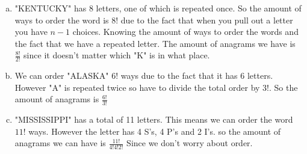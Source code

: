 \documentclass[11pt,letterpaper]{article}
\begin{document}
\begin{enumerate}[(a)]
\item
"KENTUCKY" has 8 letters, one of which is repeated once. So the amount of ways to order the word is $8!$ due to the fact that when you pull out a letter you have $n-1$ choices. Knowing the amount of ways to order the words and the fact that we have a repeated letter. The amount of anagrams we have is $\frac{8!}{2!}$ since it doesn't matter which "K" is in what place.\\
\item
We can order "ALASKA" $6!$ ways due to the fact that it has 6 letters. However "A" is repeated twice so have to divide the total order by $3!$. So the amount of anagrams is $\frac{6!}{3!}$\\
\item
"MISSISSIPPI" has a total of 11 letters. This means we can order the word $11!$ ways. However the letter has 4 S's, 4 P's and 2 I's. so the amount of anagrams we can have is $\frac{11!}{4!4!2!}$ Since we don't worry about order.
\end{enumerate}
\end{document}
